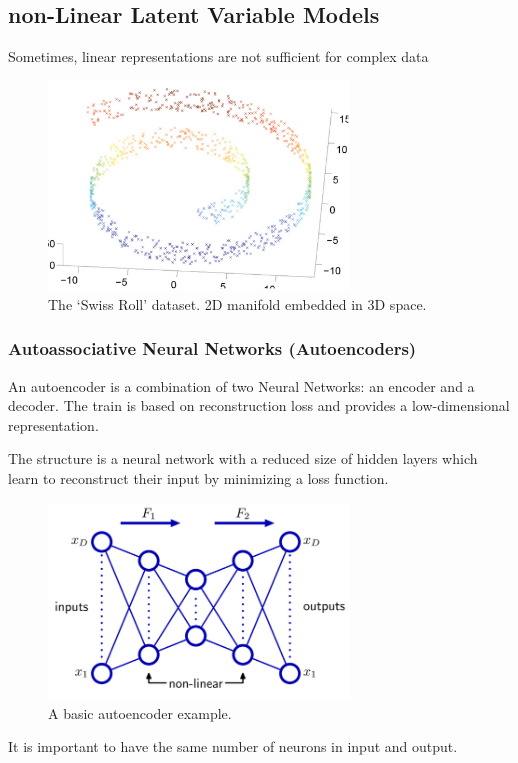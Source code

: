 \subsection{non-Linear Latent Variable Models}
Sometimes, linear representations are not sufficient for complex data
\begin{figure}
    \centering
    \includegraphics[width=8cm]{images/DimRed/non-linear-manifold.png}
    \caption{The ‘Swiss Roll’ dataset. 2D manifold embedded in 3D space.}
    \label{fig:non-linear-manifold}
\end{figure}

\subsubsection{Autoassociative Neural Networks (Autoencoders)}
An autoencoder is a combination of two Neural Networks: an encoder and a decoder. The train is based on reconstruction loss and provides a low-dimensional representation.

The structure is a neural network with a reduced size of hidden layers which learn to reconstruct their input by minimizing a loss function.
\begin{figure}[H]
    \centering
    \includegraphics[width=8cm]{images/DimRed/autoencoder.png}
    \caption{A basic autoencoder example.}
    \label{fig:non-linear-manifold}
\end{figure}
It is important to have the same number of neurons in input and output.

